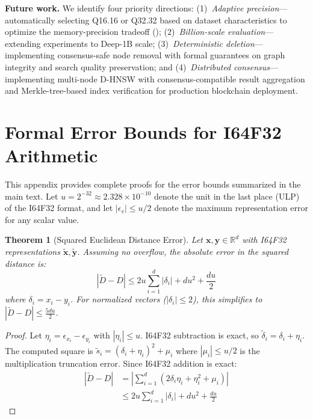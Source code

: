 \documentclass[10pt,journal]{IEEEtran}
\newtheorem{theorem}{Theorem}
\newcommand{\dhnsw}{\textsc{D-HNSW}}
\begin{document}
\textbf{Future work.} We identify four priority directions: (1)~\emph{Adaptive precision}---automatically selecting Q16.16 or Q32.32 based on dataset characteristics to optimize the memory-precision tradeoff (); (2)~\emph{Billion-scale evaluation}---extending experiments to Deep-1B scale; (3)~\emph{Deterministic deletion}---implementing consensus-safe node removal with formal guarantees on graph integrity and search quality preservation; and (4)~\emph{Distributed consensus}---implementing multi-node \dhnsw{} with consensus-compatible result aggregation and Merkle-tree-based index verification for production blockchain deployment.

\appendices
\section{Formal Error Bounds for I64F32 Arithmetic}
\label{sec:appendix_proofs}

This appendix provides complete proofs for the error bounds summarized in the main text. Let $u = 2^{-32} \approx 2.328 \times 10^{-10}$ denote the unit in the last place (ULP) of the I64F32 format, and let $|\epsilon_v| \leq u/2$ denote the maximum representation error for any scalar value.

\begin{theorem}[Squared Euclidean Distance Error]
\label{thm:sq_dist_error}
Let $\mathbf{x}, \mathbf{y} \in \mathbb{R}^d$ with I64F32 representations $\tilde{\mathbf{x}}, \tilde{\mathbf{y}}$. Assuming no overflow, the absolute error in the squared distance is:
\begin{equation}
  |\tilde{D} - D| \leq 2u\sum_{i=1}^{d}|\delta_i| + du^2 + \frac{du}{2}
\end{equation}
where $\delta_i = x_i - y_i$. For normalized vectors ($|\delta_i| \leq 2$), this simplifies to $|\tilde{D} - D| \leq \frac{5du}{2}$.
\end{theorem}

\begin{proof}
Let $\eta_i = \epsilon_{x_i} - \epsilon_{y_i}$ with $|\eta_i| \leq u$. I64F32 subtraction is exact, so $\tilde{\delta}_i = \delta_i + \eta_i$. The computed square is $\tilde{s}_i = (\delta_i + \eta_i)^2 + \mu_i$ where $|\mu_i| \leq u/2$ is the multiplication truncation error. Since I64F32 addition is exact:
\begin{align}
  |\tilde{D} - D| &= \left|\sum_{i=1}^{d}(2\delta_i\eta_i + \eta_i^2 + \mu_i)\right| \\
  &\leq 2u\sum_{i=1}^{d}|\delta_i| + du^2 + \frac{du}{2}
\end{align}
\end{proof}
\end{document}

